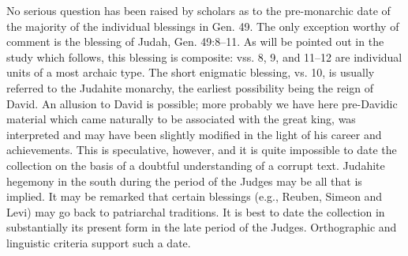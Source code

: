 {{		No serious question has been raised by scholars as to the pre-monarchic date of
		the majority of the individual blessings in Gen. 49. The only exception worthy
		of comment is the blessing of Judah, Gen. 49:8--11. As will be pointed out in
		the study which follows, this blessing is composite: vss. 8, 9, and 11--12 are
		individual units of a most archaic type. The short enigmatic blessing, vs. 10,
		is usually referred to the Judahite monarchy, the earliest possibility being
		the reign of David. An allusion to David is possible; more probably we have
		here pre-Davidic material which came naturally to be associated with the great
		king, was interpreted and may have been slightly modified in the light of his
		career and achievements. This is speculative, however, and it is quite
		impossible to date the collection on the basis of a doubtful understanding of
		a corrupt text. Judahite hegemony in the south during the period of the Judges
		may be all that is implied. It may be remarked that certain blessings (e.g.,
		Reuben, Simeon and Levi) may go back to patriarchal traditions. It is best to
		date the collection in substantially its present form in the late period of the
		Judges. Orthographic and linguistic criteria support such a date.
	}
}

{
}
{
}
{
}

{
}
{
}
{
}

